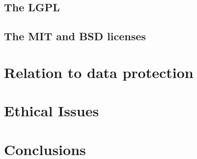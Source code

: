 \documentclass{article}
\begin{document}
\subsection{The LGPL}
\subsection{The MIT and BSD licenses}

\section{Relation to data protection}

\section{Ethical Issues}

\section{Conclusions}
\end{document}
